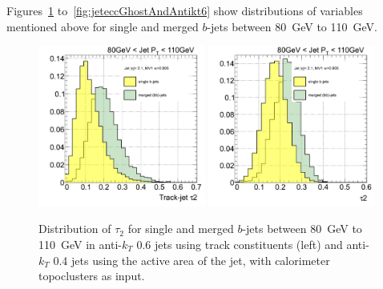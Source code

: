 Figures~\ref{fig:tau2GhostAndAntikt6} to~\ref{fig:jeteccGhostAndAntikt6} show distributions of variables mentioned above for single and merged $b$-jets  between 80~GeV to 110~GeV.

\begin{figure}[tp]
\centering
\includegraphics[width=0.49\textwidth]{FIGS/TEMPFigs/Antikt6VarsSingleMerged/Tau2080.pdf}
\includegraphics[width=0.49\textwidth]{FIGS/TEMPFigs/GhostMatchingVarsClus/Tau2080.pdf}
\caption{Distribution of $\tau_2$ for single and merged $b$-jets between 80~GeV to 110~GeV in anti-$k_T$ 0.6 jets using track constituents (left) and anti-$k_T$ 0.4 jets using the active area of the jet, with calorimeter topoclusters as input.}
\label{fig:tau2GhostAndAntikt6}
\end{figure}

